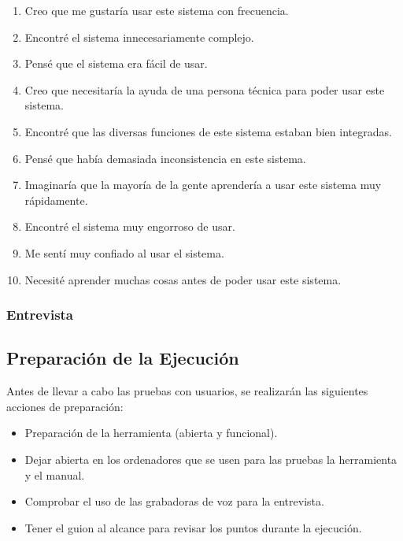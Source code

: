 \begin{enumerate}
    \item Creo que me gustaría usar este sistema con frecuencia.
    \item Encontré el sistema innecesariamente complejo.
    \item Pensé que el sistema era fácil de usar.
    \item Creo que necesitaría la ayuda de una persona técnica para poder usar este sistema.
    \item Encontré que las diversas funciones de este sistema estaban bien integradas.
    \item Pensé que había demasiada inconsistencia en este sistema.
    \item Imaginaría que la mayoría de la gente aprendería a usar este sistema muy rápidamente.
    \item Encontré el sistema muy engorroso de usar.
    \item Me sentí muy confiado al usar el sistema.
    \item Necesité aprender muchas cosas antes de poder usar este sistema.
\end{enumerate}

\subsubsection{Entrevista}
\subsection{Preparación de la Ejecución}
Antes de llevar a cabo las pruebas con usuarios, se realizarán las siguientes acciones de preparación:
\begin{itemize}
\item Preparación de la herramienta (abierta y funcional).
\item Dejar abierta en los ordenadores que se usen para las pruebas la herramienta y el manual.
\item Comprobar el uso de las grabadoras de voz para la entrevista.
\item Tener el guion al alcance para revisar los puntos durante la ejecución.
\end{itemize}
